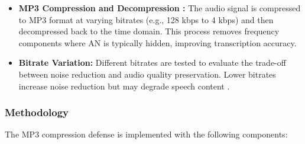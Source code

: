 \documentclass[../main.tex]{subfiles}
\begin{document}
\begin{itemize}
    \item \textbf{MP3 Compression and Decompression \cite{andronic2020mp3}:} The audio signal is compressed to MP3 format at varying bitrates (e.g., 128 kbps to 4 kbps) and then decompressed back to the time domain. This process removes frequency components where AN is typically hidden, improving transcription accuracy.
    \item \textbf{Bitrate Variation:} Different bitrates are tested to evaluate the trade-off between noise reduction and audio quality preservation. Lower bitrates increase noise reduction but may degrade speech content \cite{andronic2020mp3}.
\end{itemize}

\subsubsection{Methodology}
The MP3 compression defense is implemented with the following components:
\end{document}
